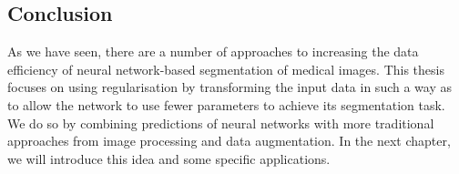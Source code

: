 %
%
%
%

\subsection{Conclusion}

As we have seen, there are a number of approaches to increasing the data efficiency of neural network-based segmentation of medical images. This thesis focuses on using regularisation by transforming the input data in such a way as to allow the network to use fewer parameters to achieve its segmentation task. We do so by combining predictions of neural networks with more traditional approaches from image processing and data augmentation. In the next chapter, we will introduce this idea and some specific applications.

